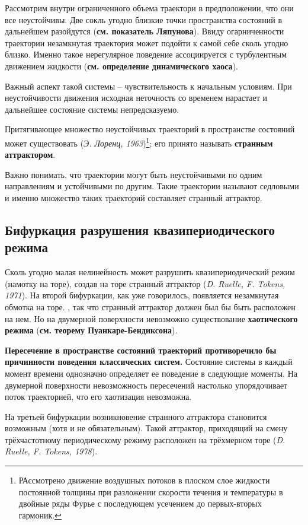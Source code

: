 Рассмотрим внутри ограниченного объема траектори в предположении, что они все неустойчивы. Две сокль угодно близкие точки пространства состояний в дальнейшем разойдутся (\textbf{см. показатель Ляпунова}). Ввиду огарниченности траектории незамкнутая траектория может подойти к самой себе сколь угодно близко. Именно такое нерегулярное поведение ассоциируется с турбулентным движением жидкости (\textbf{см. определение динамического хаоса}). 

Важный аспект такой системы -- чувствительность к начальным условиям. При неустойчивости движения исходная неточность со временем нарастает и дальнейшее состояние системы непредсказуемо.

Притягивающее множество неустойчивых траекторий в пространстве состояний может существовать (\textit{Э. Лоренц, 1963})\footnote{
    РАссмотрено движение воздушных потоков в плоском слое жидкости постоянной толщины при разложении скорости течения и температуры в двойные ряды Фурье с последующем усечением до первых-вторых гармоник.
}; его принято называть \textbf{странным аттрактором}.

Важно понимать, что траектории могут быть неустойчивыми по одним направлениям и устойчивыми по другим. Такие траектории называют седловыми и именно множество таких траекторий составляет странный аттрактор.

\subsection{Бифуркация разрушения квазипериодического режима}

Сколь угодно малая нелинейность может разрушить квазипериодический режим (намотку на торе), создав на торе странный аттрактор (\textit{D. Ruelle, F. Tokens, 1971}). На второй бифуркации, как уже говорилось, появляется незамкнутая обмотка на торе. , так что странный аттрактор должен был бы быть расположен на нем. Но на двумерной поверхности невозможно существование \textbf{хаотического режима} (\textbf{см. теорему Пуанкаре-Бендиксона}). 

\textbf{Пересечение в пространстве состояний траекторий противоречило бы причинности поведения классических систем.} Состояние системы в каждый момент времени однозначно определяет ее поведение в следующие моменты. На двумерной поверхности невозможность пересечений настолько упорядочивает поток траекторией, что его хаотизация невозможна. 

На третьей бифуркации возникновение странного аттрактора становится возможным (хотя и не обязательным). Такой аттрактор, приходящий на смену трёхчастотному периодическому режиму расположен на трёхмерном торе (\textit{D. Ruelle, F. Tokens, 1978}). 

